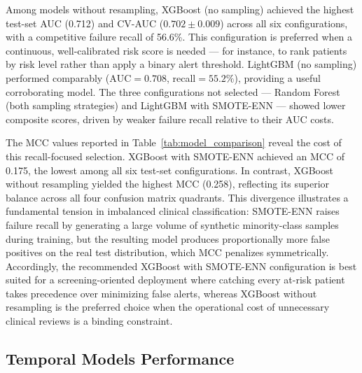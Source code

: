 \documentclass[12pt]{article}
\begin{document}
Among models without resampling, XGBoost (no sampling) achieved the highest test-set AUC (0.712) and CV-AUC ($0.702 \pm 0.009$) across all six configurations, with a competitive failure recall of 56.6\%. This configuration is preferred when a continuous, well-calibrated risk score is needed --- for instance, to rank patients by risk level rather than apply a binary alert threshold. LightGBM (no sampling) performed comparably ($\text{AUC} = 0.708$, recall$= 55.2\%$), providing a useful corroborating model. The three configurations not selected --- Random Forest (both sampling strategies) and LightGBM with SMOTE-ENN --- showed lower composite scores, driven by weaker failure recall relative to their AUC costs.

The MCC values reported in Table~\ref{tab:model_comparison} reveal the cost of this recall-focused selection. XGBoost with SMOTE-ENN achieved an MCC of 0.175, the lowest among all six test-set configurations. In contrast, XGBoost without resampling yielded the highest MCC (0.258), reflecting its superior balance across all four confusion matrix quadrants. This divergence illustrates a fundamental tension in imbalanced clinical classification: SMOTE-ENN raises failure recall by generating a large volume of synthetic minority-class samples during training, but the resulting model produces proportionally more false positives on the real test distribution, which MCC penalizes symmetrically. Accordingly, the recommended XGBoost with SMOTE-ENN configuration is best suited for a screening-oriented deployment where catching every at-risk patient takes precedence over minimizing false alerts, whereas XGBoost without resampling is the preferred choice when the operational cost of unnecessary clinical reviews is a binding constraint.


\subsection{Temporal Models Performance}
\end{document}
